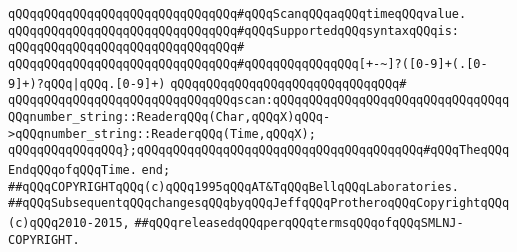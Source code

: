 \verb|qQQqqQQqqQQqqQQqqQQqqQQqqQQqqQQq#qQQqScanqQQqaqQQqtimeqQQqvalue.|\newline
\verb|qQQqqQQqqQQqqQQqqQQqqQQqqQQqqQQq#qQQqSupportedqQQqsyntaxqQQqis:|\newline
\verb|qQQqqQQqqQQqqQQqqQQqqQQqqQQqqQQq#|\newline
\verb|qQQqqQQqqQQqqQQqqQQqqQQqqQQqqQQq#qQQqqQQqqQQqqQQq[+-~]?([0-9]+(.[0-9]+)?qQQq|\verb#|qQQq.[0-9]+)#\newline
\verb|qQQqqQQqqQQqqQQqqQQqqQQqqQQqqQQq#|\newline
\verb|qQQqqQQqqQQqqQQqqQQqqQQqqQQqqQQqscan:qQQqqQQqqQQqqQQqqQQqqQQqqQQqqQQqqQQqnumber_string::ReaderqQQq(Char,qQQqX)qQQq->qQQqnumber_string::ReaderqQQq(Time,qQQqX);|\newline
\newline
\verb|qQQqqQQqqQQqqQQq};qQQqqQQqqQQqqQQqqQQqqQQqqQQqqQQqqQQqqQQq#qQQqTheqQQqEndqQQqofqQQqTime.|\newline
\verb|end;|\newline
\newline
\verb|##qQQqCOPYRIGHTqQQq(c)qQQq1995qQQqAT&TqQQqBellqQQqLaboratories.|\newline
\verb|##qQQqSubsequentqQQqchangesqQQqbyqQQqJeffqQQqProtheroqQQqCopyrightqQQq(c)qQQq2010-2015,|\newline
\verb|##qQQqreleasedqQQqperqQQqtermsqQQqofqQQqSMLNJ-COPYRIGHT.|\newline

